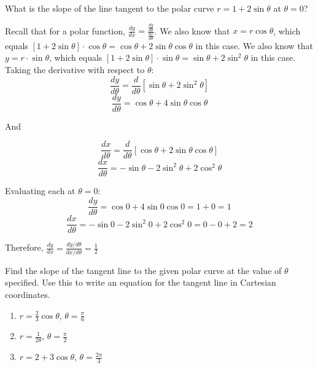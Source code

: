 \begin{Exercise} What is the slope of the line 
tangent to the polar curve $r = 1 + 2\sin{\theta}$ at $\theta = 0$?
\end{Exercise}

\begin{Answer}[ref = polar1]
Recall that for a polar function, $\frac{dy}{dx} = \frac{\frac{dy}{d\theta}}{
\frac{dx}{d\theta}}$. We also know that $x = r \cos{\theta}$, which equals 
$\left[ 1 + 2\sin{\theta} \right] \cdot \cos{\theta} = \cos{\theta} + 2\sin{
\theta}\cos{\theta}$ in this case. We also know that $y = r \cdot \sin{\theta}$, 
which equals $\left[ 1 + 2 \sin{\theta} \right] \cdot \sin{\theta} = \sin{
\theta} + 2 \sin^2{\theta}$ in this case. Taking the derivative with respect 
to $\theta$:
$$\frac{dy}{d\theta} = \frac{d}{d\theta} \left[ \sin{\theta} + 2 \sin^2{\theta} 
\right]$$
$$\frac{dy}{d\theta} = \cos{\theta} + 4\sin{\theta}\cos{\theta}$$

And

$$\frac{dx}{d\theta} = \frac{d}{d\theta} \left[ \cos{\theta} + 2\sin{\theta}\cos{
\theta} \right]$$
$$\frac{dx}{d\theta} = -\sin{\theta} - 2\sin^2{\theta} + 2\cos^2{\theta}$$

Evaluating each at $\theta = 0$:
$$\frac{dy}{d\theta} = \cos{0} + 4\sin{0}\cos{0} = 1 + 0 = 1$$
$$\frac{dx}{d\theta} = -\sin{0} - 2\sin^2{0} + 2\cos^2{0} = 0 - 0 + 2 = 2$$

Therefore, $\frac{dy}{dx} = \frac{dy/d\theta}{dx/d\theta} = \frac{1}{2}$
\end{Answer}

\begin{Exercise}[label = polar3]
Find the slope of the tangent line to the given polar curve at the value of 
$\theta$ specified. Use this to write an equation for the tangent line in 
Cartesian coordinates. 
\begin{enumerate}
\item $r = \frac{2}{3}\cos{\theta}$, $\theta = \frac{\pi}{6}$
\item $r = \frac{1}{2\theta}$, $\theta = \frac{\pi}{2}$
\item $r = 2 + 3\cos{\theta}$, $\theta = \frac{2\pi}{3}$
\end{enumerate}
\end{Exercise}

